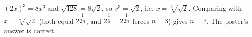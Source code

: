 $(2x)^3=8x^3$ and $\sqrt{128}=8\sqrt2$, so $x^3=\sqrt2$, i.e. $x=\sqrt[3]{\sqrt2}$. Comparing with $x=\sqrt[n]{\sqrt2}$ (both equal $2^{\dfrac{1}{2n}}$, and $2^{\dfrac{1}{6}}=2^{\dfrac{1}{2n}}$ forces $n=3$) gives $n=\boxed{3}$. The poster's answer is correct.
